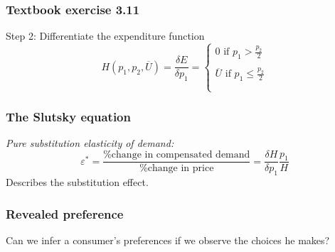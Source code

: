 \documentclass[xcolor=pdftex,dvipsnames]{beamer}
\begin{document}
\begin{frame}
\frametitle{Textbook exercise 3.11}
Step 2: Differentiate the expenditure function
\[
H(p_1,p_2,\overline U) = \frac{\delta E}{\delta p_1}=\left\{\begin{array}{l}
0 \text{ if }p_1>\frac{p_2}{2} \\\\
\overline U\text{ if } p_1\leq\frac{p_2}{2} \\\\
\end{array}\right.
\]

\end{frame}




\begin{frame}\frametitle{The Slutsky equation}
\emph{Pure substitution elasticity of demand:}
\[
\varepsilon^*=\frac{\text{\% change in compensated demand}}{\text{\%
    change in price}} = \frac{\delta H}{\delta p_1}\frac{p_1}{H}
\] Describes the substitution effect.

\bigskip
{}



\end{frame}

\begin{frame}\frametitle{Revealed preference}
Can we infer a consumer's preferences if we observe the choices he
makes?



\bigskip
{}
\end{frame}
\end{document}
